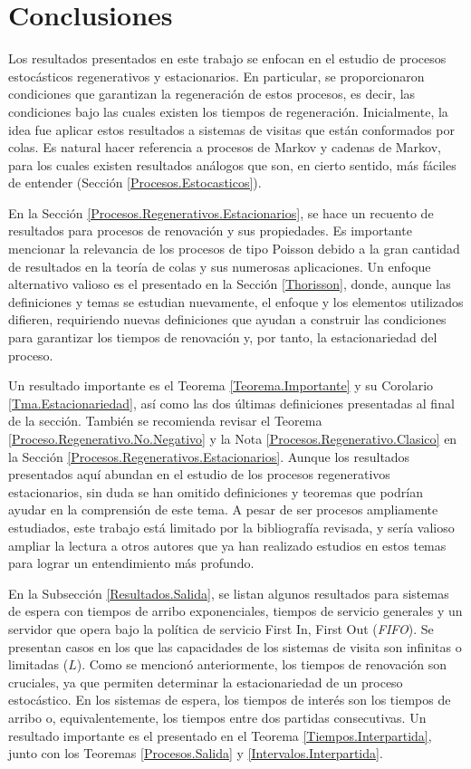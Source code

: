 \documentclass{article}
\numberwithin{equation}{section}
\begin{document}
\section{Conclusiones}


Los resultados presentados en este trabajo se enfocan en el estudio de procesos estocásticos regenerativos y estacionarios. En particular, se proporcionaron condiciones que garantizan la regeneración de estos procesos, es decir, las condiciones bajo las cuales existen los tiempos de regeneración. Inicialmente, la idea fue aplicar estos resultados a sistemas de visitas que están conformados por colas. Es natural hacer referencia a procesos de Markov y cadenas de Markov, para los cuales existen resultados análogos que son, en cierto sentido, más fáciles de entender (Secci\'on \ref{Procesos.Estocasticos}).

En la Sección \ref{Procesos.Regenerativos.Estacionarios}, se hace un recuento de resultados para procesos de renovación y sus propiedades. Es importante mencionar la relevancia de los procesos de tipo Poisson debido a la gran cantidad de resultados en la teoría de colas y sus numerosas aplicaciones. Un enfoque alternativo valioso es el presentado en la Sección \ref{Thorisson}, donde, aunque las definiciones y temas se estudian nuevamente, el enfoque y los elementos utilizados difieren, requiriendo nuevas definiciones que ayudan a construir las condiciones para garantizar los tiempos de renovación y, por tanto, la estacionariedad del proceso.

Un resultado importante es el Teorema \ref{Teorema.Importante} y su Corolario \ref{Tma.Estacionariedad}, así como las dos últimas definiciones presentadas al final de la sección. También se recomienda revisar el Teorema \ref{Proceso.Regenerativo.No.Negativo} y la Nota \ref{Procesos.Regenerativo.Clasico} en la Sección \ref{Procesos.Regenerativos.Estacionarios}. Aunque los resultados presentados aquí abundan en el estudio de los procesos regenerativos estacionarios, sin duda se han omitido definiciones y teoremas que podrían ayudar en la comprensión de este tema. A pesar de ser procesos ampliamente estudiados, este trabajo está limitado por la bibliografía revisada, y sería valioso ampliar la lectura a otros autores que ya han realizado estudios en estos temas para lograr un entendimiento más profundo.

En la Subsección \ref{Resultados.Salida}, se listan algunos resultados para sistemas de espera con tiempos de arribo exponenciales, tiempos de servicio generales y un servidor que opera bajo la política de servicio First In, First Out (\textit{FIFO}). Se presentan casos en los que las capacidades de los sistemas de visita son infinitas o limitadas ($L$). Como se mencionó anteriormente, los tiempos de renovación son cruciales, ya que permiten determinar la estacionariedad de un proceso estocástico. En los sistemas de espera, los tiempos de interés son los tiempos de arribo o, equivalentemente, los tiempos entre dos partidas consecutivas. Un resultado importante es el presentado en el Teorema \ref{Tiempos.Interpartida}, junto con los Teoremas \ref{Procesos.Salida} y \ref{Intervalos.Interpartida}.
\end{document}
